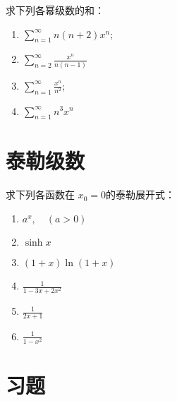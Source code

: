 \begin{problem}
    求下列各幂级数的和：
    \begin{enumerate}
        \item \(\sum_{n=1}^{\infty} n(n + 2) x^n\);
        \item \(\sum_{n=2}^{\infty} \frac{x^n}{n(n - 1)}\)
        \item \(\sum_{n=1}^{\infty} \frac{x^n}{n^2}\);
        \item \(\sum_{n=1}^{\infty} n^{3}x^{n}\)
    \end{enumerate}
\end{problem}
\section{泰勒级数}

\begin{problem}
    求下列各函数在 \(x_0 = 0\)的泰勒展开式：
    \begin{enumerate}
        \item \(a^x, \quad (a > 0)\)
        \item \(\sinh x\)
        \item \((1 + x) \ln(1 + x)\)
        \item \(\frac{1}{1 - 3x + 2x^2}\)
        \item \(\frac{1}{2x+1}\)
        \item \(\frac{1}{1 - x^2}\)
    \end{enumerate}
\end{problem}
\section{习题}
